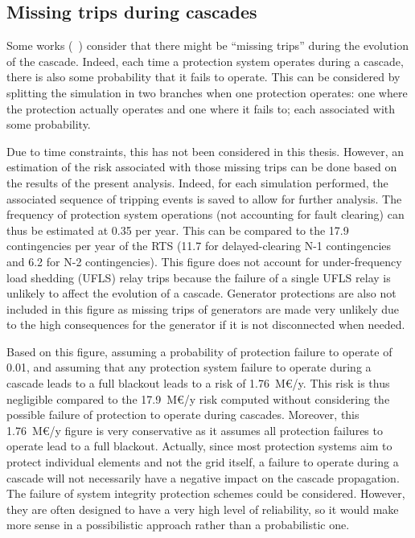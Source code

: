 \subsection{Missing trips during cascades}
\label{sec:PDSA_results_missing_trips}

Some works (\eg~\cite{Faghihi, DCATphase1}) consider that there might be ``missing trips'' during the evolution of the cascade. Indeed, each time a protection system operates during a cascade, there is also some probability that it fails to operate. This can be considered by splitting the simulation in two branches when one protection operates: one where the protection actually operates and one where it fails to; each associated with some probability.

Due to time constraints, this has not been considered in this thesis. However, an estimation of the risk associated with those missing trips can be done based on the results of the present analysis. Indeed, for each simulation performed, the associated sequence of tripping events is saved to allow for further analysis. The frequency of protection system operations (not accounting for fault clearing) can thus be estimated at 0.35 per year. This can be compared to the 17.9 contingencies per year of the RTS (11.7 for delayed-clearing N-1 contingencies and 6.2 for N-2 contingencies). This figure does not account for under-frequency load shedding (UFLS) relay trips because the failure of a single UFLS relay is unlikely to affect the evolution of a cascade. Generator protections are also not included in this figure as missing trips of generators are made very unlikely due to the high consequences for the generator if it is not disconnected when needed.

Based on this figure, assuming a probability of protection failure to operate of 0.01, and assuming that any protection system failure to operate during a cascade leads to a full blackout leads to a risk of 1.76~M€/y. This risk is thus negligible compared to the 17.9~M€/y risk computed without considering the possible failure of protection to operate during cascades. Moreover, this 1.76~M€/y figure is very conservative as it assumes all protection failures to operate lead to a full blackout. Actually, since most protection systems aim to protect individual elements and not the grid itself, a failure to operate during a cascade will not necessarily have a negative impact on the cascade propagation. The failure of system integrity protection schemes could be considered. However, they are often designed to have a very high level of reliability, so it would make more sense in a possibilistic approach rather than a probabilistic one.

